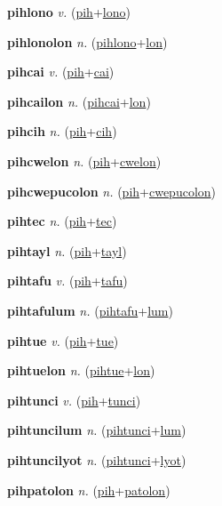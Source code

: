 \textbf{\hypertarget{pihlono}{pihlono}} \textit{v.} (\hyperlink{pih}{pih}+\allowbreak \hyperlink{lono}{lono})


\textbf{\hypertarget{pihlonolon}{pihlonolon}} \textit{n.} (\hyperlink{pihlono}{pihlono}+\allowbreak \hyperlink{lon}{lon})


\textbf{\hypertarget{pihcai}{pihcai}} \textit{v.} (\hyperlink{pih}{pih}+\allowbreak \hyperlink{cai}{cai})


\textbf{\hypertarget{pihcailon}{pihcailon}} \textit{n.} (\hyperlink{pihcai}{pihcai}+\allowbreak \hyperlink{lon}{lon})


\textbf{\hypertarget{pihcih}{pihcih}} \textit{n.} (\hyperlink{pih}{pih}+\allowbreak \hyperlink{cih}{cih})


\textbf{\hypertarget{pihcwelon}{pihcwelon}} \textit{n.} (\hyperlink{pih}{pih}+\allowbreak \hyperlink{cwelon}{cwelon})


\textbf{\hypertarget{pihcwepucolon}{pihcwepucolon}} \textit{n.} (\hyperlink{pih}{pih}+\allowbreak \hyperlink{cwepucolon}{cwepucolon})


\textbf{\hypertarget{pihtec}{pihtec}} \textit{n.} (\hyperlink{pih}{pih}+\allowbreak \hyperlink{tec}{tec})


\textbf{\hypertarget{pihtayl}{pihtayl}} \textit{n.} (\hyperlink{pih}{pih}+\allowbreak \hyperlink{tayl}{tayl})


\textbf{\hypertarget{pihtafu}{pihtafu}} \textit{v.} (\hyperlink{pih}{pih}+\allowbreak \hyperlink{tafu}{tafu})


\textbf{\hypertarget{pihtafulum}{pihtafulum}} \textit{n.} (\hyperlink{pihtafu}{pihtafu}+\allowbreak \hyperlink{lum}{lum})


\textbf{\hypertarget{pihtue}{pihtue}} \textit{v.} (\hyperlink{pih}{pih}+\allowbreak \hyperlink{tue}{tue})


\textbf{\hypertarget{pihtuelon}{pihtuelon}} \textit{n.} (\hyperlink{pihtue}{pihtue}+\allowbreak \hyperlink{lon}{lon})


\textbf{\hypertarget{pihtunci}{pihtunci}} \textit{v.} (\hyperlink{pih}{pih}+\allowbreak \hyperlink{tunci}{tunci})


\textbf{\hypertarget{pihtuncilum}{pihtuncilum}} \textit{n.} (\hyperlink{pihtunci}{pihtunci}+\allowbreak \hyperlink{lum}{lum})


\textbf{\hypertarget{pihtuncilyot}{pihtuncilyot}} \textit{n.} (\hyperlink{pihtunci}{pihtunci}+\allowbreak \hyperlink{lyot}{lyot})


\textbf{\hypertarget{pihpatolon}{pihpatolon}} \textit{n.} (\hyperlink{pih}{pih}+\allowbreak \hyperlink{patolon}{patolon})


